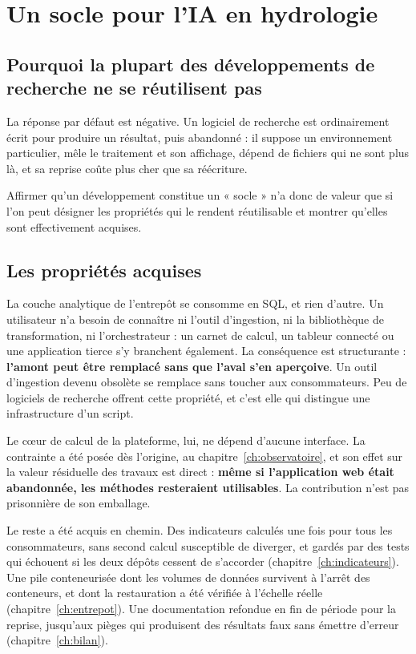 \chapter{Un socle pour l'IA en hydrologie}
\label{ch:socle}


\section{Pourquoi la plupart des développements de recherche ne se réutilisent pas}

La réponse par défaut est négative. Un logiciel de recherche est ordinairement écrit pour produire un résultat, puis abandonné : il
suppose un environnement particulier, mêle le traitement et son affichage, dépend de fichiers
qui ne sont plus là, et sa reprise coûte plus cher que sa réécriture.

Affirmer qu'un développement constitue un « socle » n'a donc de valeur que si l'on peut désigner
les propriétés qui le rendent réutilisable et montrer qu'elles sont effectivement acquises.

\section{Les propriétés acquises}

La couche analytique de l'entrepôt se consomme en SQL, et rien d'autre. Un utilisateur n'a besoin
de connaître ni l'outil d'ingestion, ni la bibliothèque de transformation, ni l'orchestrateur :
un carnet de calcul, un tableur connecté ou une application tierce s'y branchent également. La
conséquence est structurante : \textbf{l'amont peut être remplacé sans que l'aval s'en
aperçoive}. Un outil d'ingestion devenu obsolète se remplace sans
toucher aux consommateurs. Peu de logiciels de recherche offrent cette propriété, et c'est
elle qui distingue une infrastructure d'un script.

Le cœur de calcul de la plateforme, lui, ne dépend d'aucune interface. La contrainte a été posée
dès l'origine, au chapitre~\ref{ch:observatoire}, et son effet sur la valeur résiduelle des
travaux est direct : \textbf{même si l'application web était abandonnée, les méthodes
resteraient utilisables}. La contribution n'est pas prisonnière de son emballage.

Le reste a été acquis en chemin. Des indicateurs calculés une fois pour tous les consommateurs,
sans second calcul susceptible de diverger, et gardés par des tests qui échouent si les deux
dépôts cessent de s'accorder (chapitre~\ref{ch:indicateurs}). Une pile conteneurisée dont les
volumes de données survivent à l'arrêt des conteneurs, et dont la restauration a été vérifiée à
l'échelle réelle (chapitre~\ref{ch:entrepot}). Une documentation refondue en fin de période pour
la reprise, jusqu'aux pièges qui produisent des résultats faux sans émettre d'erreur
(chapitre~\ref{ch:bilan}).

